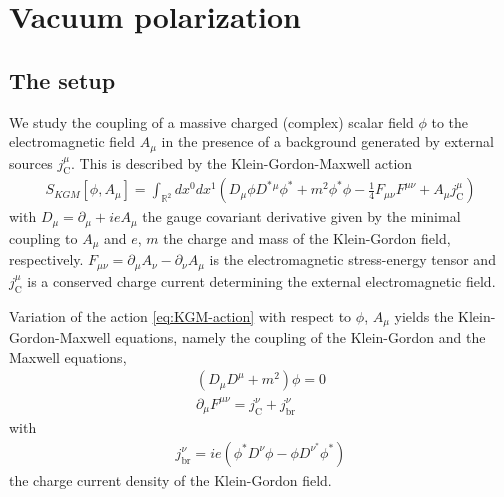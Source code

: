 \chapter{Vacuum polarization}
\label{cha:Vacuum-Polarization}

\section{The setup}

We study the coupling of a massive charged (complex) scalar field $\phi$ to the electromagnetic field $A_\mu$ in the presence of a background generated by external sources $j^\mu_\text{C}$. This is described by the Klein-Gordon-Maxwell action
\begin{align}
	S_{KGM} [\phi, A_\mu] = \int_{\mathbb{R}^2}^{} dx^{0}dx^{1} \left( D_\mu \phi D^*{}^{\mu}\phi^* 
	+ m^2\phi^* \phi - \frac{1}{4}F_{\mu\nu} F^{\mu\nu} + A_\mu j_{\text{C}}^{\mu} \right)  	
	\label{eq:KGM-action}
\end{align}
with $D_\mu = \partial_\mu + ieA_\mu$ the gauge covariant derivative given by the minimal coupling to $A_\mu$ and  $e$, $m$ the charge and mass of the Klein-Gordon field, respectively. $F_{\mu\nu} = \partial_\mu A_\nu - \partial_\nu A_\mu$ is the electromagnetic stress-energy tensor and $j_{\text{C}}^\mu$ is a conserved charge current determining the external electromagnetic field.

Variation of the action \eqref{eq:KGM-action} with respect to $\phi$, $A_\mu$ yields the Klein-Gordon-Maxwell equations, namely the coupling of the Klein-Gordon and the Maxwell equations, 
\begin{subequations}
	\begin{align}
			\left( D_\mu D^\mu +m^2  \right) \phi = 0 
		\label{eq:klein-gordon-equation}\\
			\partial_\mu F^{\mu\nu}= j_{\text{C}}^{\nu} + j_{\text{br}}^\nu 
		\label{eq:quantum-maxwell-equation}
	\end{align}
\end{subequations}
with 
\begin{align}
	j^{\nu}_{\text{br}} = ie\left( \phi^* D^\nu \phi - \phi D^\nu^* \phi^* \right) 
\end{align}
the charge current density of the Klein-Gordon field. 

